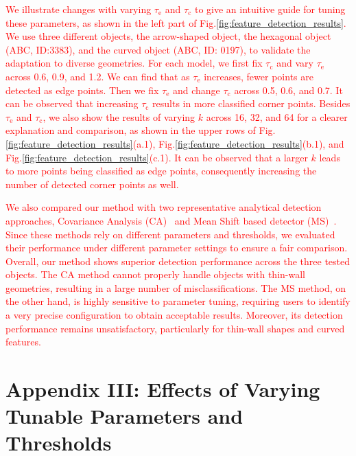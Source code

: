 \documentclass[onecolumn]{IEEEtran}
\newcommand{\rev}[1]{\textcolor{red}{#1}}
\begin{document}
\rev{We illustrate changes with varying $\tau_\text{e}$ and $\tau_\text{c}$ to give an intuitive guide for tuning these parameters, as shown in the left part of Fig.\ref{fig:feature_detection_results}. We use three different objects, the arrow-shaped object, the hexagonal object (ABC, ID:3383), and the curved object (ABC, ID: 0197), to validate the adaptation to diverse geometries. For each model, we first fix $\tau_\text{c}$ and vary $\tau_\text{e}$ across 0.6, 0.9, and 1.2. We can find that as $\tau_\text{e}$ increases, fewer points are detected as edge points. Then we fix $\tau_\text{e}$ and change $\tau_\text{c}$ across 0.5, 0.6, and 0.7. It can be observed that increasing $\tau_\text{c}$ results in more classified corner points. 
Besides $\tau_\text{e}$ and $\tau_\text{c}$, we also show the results of varying $k$ across 16, 32, and 64 for a clearer explanation and comparison, as shown in the upper rows of Fig.\ref{fig:feature_detection_results}(a.1), Fig.\ref{fig:feature_detection_results}(b.1), and Fig.\ref{fig:feature_detection_results}(c.1). It can be observed that a larger $k$ leads to more points being classified as edge points, consequently increasing the number of detected corner points as well.}

\rev{We also compared our method with two representative analytical detection approaches, Covariance Analysis (CA)~\cite{bazazian_fast_2015b} and Mean Shift based detector (MS)~\cite{ahmed2018edge}. Since these methods rely on different parameters and thresholds, we evaluated their performance under different parameter settings to ensure a fair comparison. Overall, our method shows superior detection performance across the three tested objects.
The CA method cannot properly handle objects with thin-wall geometries, resulting in a large number of misclassifications. The MS method, on the other hand, is highly sensitive to parameter tuning, requiring users to identify a very precise configuration to obtain acceptable results. Moreover, its detection performance remains unsatisfactory, particularly for thin-wall shapes and curved features.}


\section{Appendix III: Effects of Varying Tunable Parameters and Thresholds}
\end{document}
